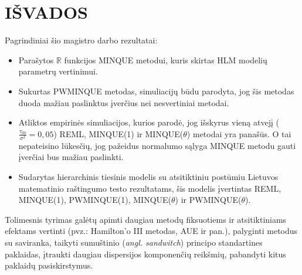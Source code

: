 \documentclass[11pt,a4paper]{article}
\newcommand{\R}{{\mathbb R}}
\begin{document}
\newpage
\section{IŠVADOS}
\indent Pagrindiniai šio magistro darbo rezultatai:
\begin{itemize}
\item Parašytos $\R$ funkcijos MINQUE metodui, kuris skirtas HLM modelių parametrų vertinimui.
\item Sukurtas PWMINQUE metodas, simuliacijų būdu parodyta, jog šis metodas duoda mažiau paslinktus įverčius nei nesvertiniai metodai.
\item Atliktos empirinės simuliacijos, kurios parodė, jog išskyrus vieną atvejį ($\frac{\tau_{00}}{\sigma^2}=0,05$) REML, MINQUE(1) ir MINQUE($\theta$) metodai yra panašūs. O tai nepateisino lūkesčių, jog pažeidus normalumo sąlyga MINQUE metodu gauti įverčiai bus mažiau paslinkti.
\item Sudarytas hierarchinis tiesinis modelis su atsitiktiniu postūmiu Lietuvos matematinio raštingumo testo rezultatams, šis modelis įvertintas REML, MINQUE(1), PWMINQUE(1), MINQUE($\theta$) ir PWMINQUE($\theta$).
\end{itemize}

\indent Tolimesnis tyrimas galėtų apimti daugiau metodų fiksuotiems ir atsitiktiniams efektams vertinti (pvz.: Hamilton'o III metodas, AUE ir pan.), palyginti metodus su saviranka, taikyti sumuštinio (\textit{angl. sandwitch}) principo standartines paklaidas, įtraukti daugiau dispersijos komponenčių reikšmių, pabandyti kitus paklaidų pasiskirstymus.
\end{document}
